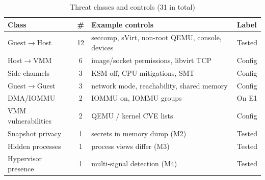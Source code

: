 \documentclass[conference]{IEEEtran}
\begin{document}
\begin{table}[!t]
\caption{Threat classes and controls (31 in total)}
\label{tab:tax}
\centering\footnotesize
\begin{tabular}{@{}p{2.15cm}cp{3.1cm}p{1.15cm}@{}}
\toprule
Class & \# & Example controls & Label \\
\midrule
Guest$\to$Host & 12 & seccomp, sVirt, non-root QEMU, console, devices & Tested \\
Host$\to$VMM & 6 & image/socket permissions, libvirt TCP & Config \\
Side channels & 3 & KSM off, CPU mitigations, SMT & Config \\
Guest$\to$Guest & 3 & network mode, reachability, shared memory & Config \\
DMA/IOMMU & 2 & IOMMU on, IOMMU groups & On E1 \\
VMM vulnerabilities & 2 & QEMU / kernel CVE lists & Config \\
Snapshot privacy & 1 & secrets in memory dump (M2) & Tested \\
Hidden processes & 1 & process views differ (M3) & Tested \\
Hypervisor presence & 1 & multi-signal detection (M4) & Tested \\
\bottomrule
\end{tabular}
\end{table}
\end{document}
